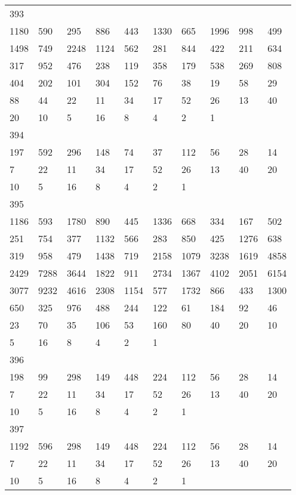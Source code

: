 \begin{longtable}{*{10}{l}}
393&&&&&&&&&\\
1180& 590& 295& 886& 443& 1330& 665& 1996& 998& 499\\
1498& 749& 2248& 1124& 562& 281& 844& 422& 211& 634\\
317& 952& 476& 238& 119& 358& 179& 538& 269& 808\\
404& 202& 101& 304& 152& 76& 38& 19& 58& 29\\
88& 44& 22& 11& 34& 17& 52& 26& 13& 40\\
20& 10& 5& 16& 8& 4& 2& 1& \\

394&&&&&&&&&\\
197& 592& 296& 148& 74& 37& 112& 56& 28& 14\\
7& 22& 11& 34& 17& 52& 26& 13& 40& 20\\
10& 5& 16& 8& 4& 2& 1& \\

395&&&&&&&&&\\
1186& 593& 1780& 890& 445& 1336& 668& 334& 167& 502\\
251& 754& 377& 1132& 566& 283& 850& 425& 1276& 638\\
319& 958& 479& 1438& 719& 2158& 1079& 3238& 1619& 4858\\
2429& 7288& 3644& 1822& 911& 2734& 1367& 4102& 2051& 6154\\
3077& 9232& 4616& 2308& 1154& 577& 1732& 866& 433& 1300\\
650& 325& 976& 488& 244& 122& 61& 184& 92& 46\\
23& 70& 35& 106& 53& 160& 80& 40& 20& 10\\
5& 16& 8& 4& 2& 1& \\

396&&&&&&&&&\\
198& 99& 298& 149& 448& 224& 112& 56& 28& 14\\
7& 22& 11& 34& 17& 52& 26& 13& 40& 20\\
10& 5& 16& 8& 4& 2& 1& \\

397&&&&&&&&&\\
1192& 596& 298& 149& 448& 224& 112& 56& 28& 14\\
7& 22& 11& 34& 17& 52& 26& 13& 40& 20\\
10& 5& 16& 8& 4& 2& 1& \\


\end{longtable}
